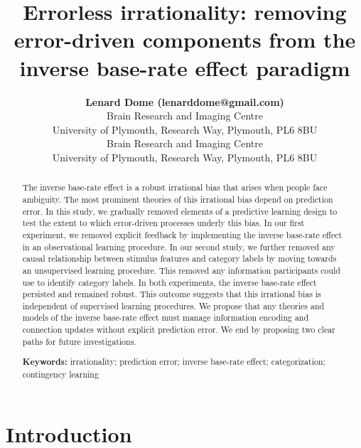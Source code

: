 \documentclass[10pt,letterpaper]{article}
\title{Errorless irrationality: removing error-driven components from the inverse base-rate effect paradigm}
\author{{\large \bf Lenard Dome (lenarddome@gmail.com)} \\
  Brain Research and Imaging Centre \\
  University of Plymouth, Research Way, Plymouth, PL6 8BU
  \AND {\large \bf Andy J. Wills (andy.wills@plymouth.ac.uk)} \\
  Brain Research and Imaging Centre \\
  University of Plymouth, Research Way, Plymouth, PL6 8BU}
\begin{document}
\maketitle

\begin{abstract}

The inverse base-rate effect is a robust irrational bias that arises when people face ambiguity.
The most prominent theories of this irrational bias depend on prediction error.
In this study, we gradually removed elements of a predictive learning design to test the extent to which error-driven processes underly this bias.
In our first experiment, we removed explicit feedback by implementing the inverse base-rate effect in an observational learning procedure. 
In our second study, we further removed any causal relationship between stimulus features and category labels by moving towards an unsupervised learning procedure.
This removed any information participants could use to identify category labels.
In both experiments, the inverse base-rate effect persisted and remained robust.
This outcome suggests that this irrational bias is independent of supervised learning procedures.
We propose that any theories and models of the inverse base-rate effect must manage information encoding and connection updates without explicit prediction error.
We end by proposing two clear paths for future investigations.

\textbf{Keywords:} 
irrationality; prediction error; inverse base-rate effect; categorization; contingency learning
\end{abstract}


\section{Introduction}
\end{document}
